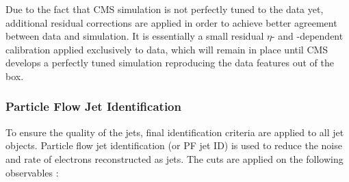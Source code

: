 

Due to the fact that CMS simulation is not perfectly tuned to the data yet, additional residual corrections are applied
in order to achieve better agreement between data and simulation. It is essentially a small residual $\eta$- and
\pt-dependent calibration applied exclusively to data, which will remain in place until CMS develops a perfectly tuned
simulation reproducing the data features out of the box.



\subsubsection{Particle Flow Jet Identification}
\label{sss:PFJet_ID}
To ensure the quality of the jets, final identification criteria are applied to all jet objects. Particle flow jet
identification (or PF jet ID) is used to reduce the noise and rate of electrons reconstructed as jets. The cuts are
applied on the following observables :

